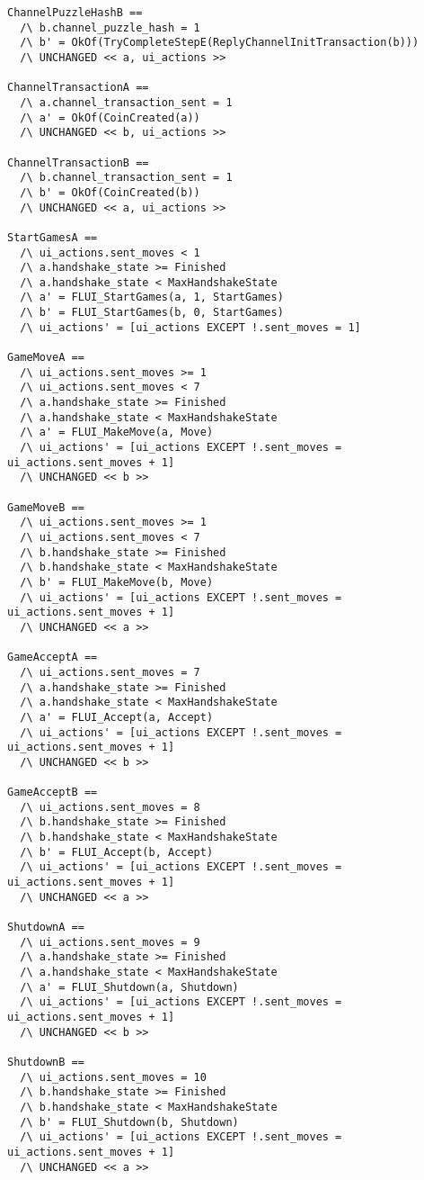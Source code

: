 \documentclass[a4paper]{article}
\begin{document}
\begin{multicols}{2}
\begin{verbatim}
ChannelPuzzleHashB ==
  /\ b.channel_puzzle_hash = 1
  /\ b' = OkOf(TryCompleteStepE(ReplyChannelInitTransaction(b)))
  /\ UNCHANGED << a, ui_actions >>

ChannelTransactionA ==
  /\ a.channel_transaction_sent = 1
  /\ a' = OkOf(CoinCreated(a))
  /\ UNCHANGED << b, ui_actions >>

ChannelTransactionB ==
  /\ b.channel_transaction_sent = 1
  /\ b' = OkOf(CoinCreated(b))
  /\ UNCHANGED << a, ui_actions >>

StartGamesA ==
  /\ ui_actions.sent_moves < 1
  /\ a.handshake_state >= Finished
  /\ a.handshake_state < MaxHandshakeState
  /\ a' = FLUI_StartGames(a, 1, StartGames)
  /\ b' = FLUI_StartGames(b, 0, StartGames)
  /\ ui_actions' = [ui_actions EXCEPT !.sent_moves = 1]

GameMoveA ==
  /\ ui_actions.sent_moves >= 1 
  /\ ui_actions.sent_moves < 7
  /\ a.handshake_state >= Finished
  /\ a.handshake_state < MaxHandshakeState
  /\ a' = FLUI_MakeMove(a, Move)
  /\ ui_actions' = [ui_actions EXCEPT !.sent_moves = ui_actions.sent_moves + 1]
  /\ UNCHANGED << b >>

GameMoveB ==
  /\ ui_actions.sent_moves >= 1 
  /\ ui_actions.sent_moves < 7
  /\ b.handshake_state >= Finished
  /\ b.handshake_state < MaxHandshakeState
  /\ b' = FLUI_MakeMove(b, Move)
  /\ ui_actions' = [ui_actions EXCEPT !.sent_moves = ui_actions.sent_moves + 1]
  /\ UNCHANGED << a >>

GameAcceptA ==
  /\ ui_actions.sent_moves = 7
  /\ a.handshake_state >= Finished
  /\ a.handshake_state < MaxHandshakeState
  /\ a' = FLUI_Accept(a, Accept)
  /\ ui_actions' = [ui_actions EXCEPT !.sent_moves = ui_actions.sent_moves + 1]
  /\ UNCHANGED << b >>

GameAcceptB ==
  /\ ui_actions.sent_moves = 8
  /\ b.handshake_state >= Finished
  /\ b.handshake_state < MaxHandshakeState
  /\ b' = FLUI_Accept(b, Accept)
  /\ ui_actions' = [ui_actions EXCEPT !.sent_moves = ui_actions.sent_moves + 1]
  /\ UNCHANGED << a >>

ShutdownA ==
  /\ ui_actions.sent_moves = 9
  /\ a.handshake_state >= Finished
  /\ a.handshake_state < MaxHandshakeState
  /\ a' = FLUI_Shutdown(a, Shutdown)
  /\ ui_actions' = [ui_actions EXCEPT !.sent_moves = ui_actions.sent_moves + 1]
  /\ UNCHANGED << b >>

ShutdownB ==
  /\ ui_actions.sent_moves = 10
  /\ b.handshake_state >= Finished
  /\ b.handshake_state < MaxHandshakeState
  /\ b' = FLUI_Shutdown(b, Shutdown)
  /\ ui_actions' = [ui_actions EXCEPT !.sent_moves = ui_actions.sent_moves + 1]
  /\ UNCHANGED << a >>


\end{verbatim}
\end{multicols}
\end{document}
